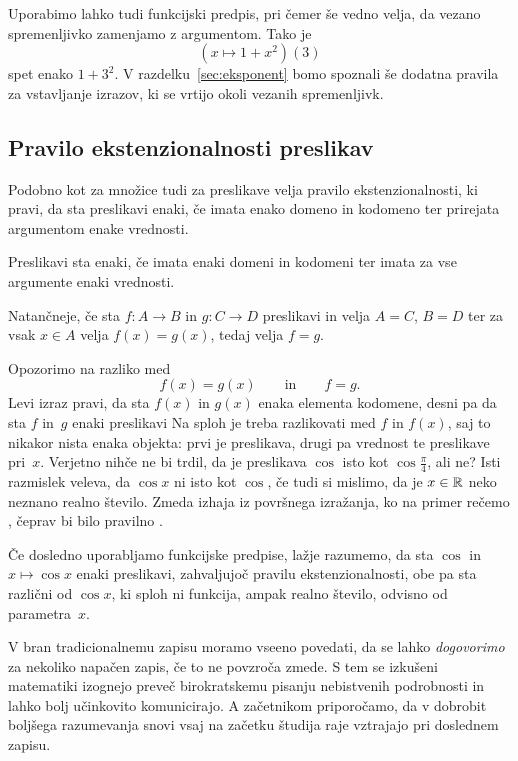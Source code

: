 Uporabimo lahko tudi funkcijski predpis, pri čemer še vedno velja, da vezano spremenljivko zamenjamo z argumentom.
Tako je
%
\begin{equation*}
  (x \mapsto 1 + x^2)(3)
\end{equation*}
%
spet enako $1 + 3^2$.
%
V razdelku~\ref{sec:eksponent} bomo spoznali še dodatna pravila za vstavljanje izrazov, ki se vrtijo okoli vezanih spremenljivk.


\subsection{Pravilo ekstenzionalnosti preslikav}

Podobno kot za množice tudi za preslikave velja pravilo ekstenzionalnosti, ki pravi, da sta preslikavi enaki, če imata enako domeno in kodomeno ter prirejata argumentom enake vrednosti.


\begin{pravilo}
  Preslikavi sta enaki, če imata enaki domeni in kodomeni ter imata za vse argumente
  enaki vrednosti.
\end{pravilo}

Natančneje, če sta $f : A \to B$ in $g : C \to D$ preslikavi in velja $A = C$, $B = D$ ter
za vsak $x \in A$ velja $f(x) = g(x)$, tedaj velja $f = g$.

Opozorimo na razliko med
%
\begin{equation*}
  f(x) = g(x)
  \qquad\text{in}\qquad
  f = g.
\end{equation*}
%
Levi izraz pravi, da sta $f(x)$ in $g(x)$ enaka elementa kodomene, desni pa da sta $f$ in~$g$ enaki preslikavi
%
Na sploh je treba razlikovati med $f$ in $f(x)$, saj to nikakor nista enaka objekta: prvi je
preslikava, drugi pa vrednost te preslikave pri~$x$. Verjetno nihče ne bi trdil, da je
preslikava $\cos$ isto kot $\cos \frac{\pi}{4}$, ali ne? Isti razmislek veleva, da
$\cos x$ ni isto kot $\cos$, če tudi si mislimo, da je $x \in \mathbb{R}$ neko neznano realno število.
Zmeda izhaja iz površnega izražanja, ko na primer rečemo , čeprav bi bilo pravilno .

Če dosledno uporabljamo funkcijske predpise, lažje razumemo, da sta $\cos$ in $x \mapsto \cos x$ enaki preslikavi, zahvaljujoč pravilu ekstenzionalnosti, obe pa sta različni od $\cos x$, ki sploh ni funkcija, ampak realno število, odvisno od parametra~$x$.

V bran tradicionalnemu zapisu moramo vseeno povedati, da se lahko \emph{dogovorimo} za
nekoliko napačen zapis, če to ne povzroča zmede. S tem se izkušeni matematiki izognejo preveč birokratskemu
pisanju nebistvenih podrobnosti in lahko bolj učinkovito komunicirajo.
%
A začetnikom priporočamo, da v dobrobit boljšega razumevanja snovi vsaj na začetku študija raje vztrajajo pri doslednem zapisu.

